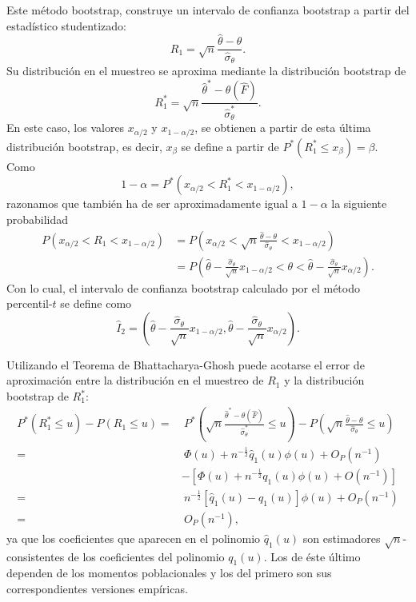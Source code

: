 \documentclass[]{book}
\theoremstyle{break}
\theoremstyle{definition}
\theoremstyle{definition}
\theoremstyle{definition}
\theoremstyle{remark}
\begin{document}
Este método bootstrap, construye un intervalo de confianza bootstrap a
partir del estadístico studentizado:
\[R_1=\sqrt{n}\frac{\hat{\theta}-\theta }{\hat{\sigma}_{\theta }}.\] Su
distribución en el muestreo se aproxima mediante la distribución
bootstrap de
\[R_1^{\ast}=\sqrt{n}\frac{\hat{\theta}^{\ast}-\theta \left( \hat{F}
 \right)}{\hat{\sigma}_{\theta }^{\ast}}.\] En este caso, los valores
\(x_{\alpha /2}\) y \(x_{1-\alpha /2}\), se obtienen a partir de esta
última distribución bootstrap, es decir, \(x_{\beta }\) se define a
partir de \(P^{\ast}\left( R_1^{\ast}\leq x_{\beta } \right) =\beta\).
Como
\[1-\alpha =P^{\ast}\left( x_{\alpha /2}<R_1^{\ast}<x_{1-\alpha /2} \right),\]
razonamos que también ha de ser aproximadamente igual a \(1-\alpha\) la
siguiente probabilidad \[\begin{aligned}
P\left( x_{\alpha /2}<R_1<x_{1-\alpha /2} \right) &= P\left( x_{\alpha /2}<
\sqrt{n}\frac{\hat{\theta}-\theta }{\hat{\sigma}_{\theta }}<x_{1-\alpha
/2} \right) \\
&= P\left( \hat{\theta}-\frac{\hat{\sigma}_{\theta }}{\sqrt{n}}x_{1-\alpha
/2}<\theta <\hat{\theta}-\frac{\hat{\sigma}_{\theta }}{\sqrt{n}}x_{\alpha
/2} \right).
\end{aligned}\] Con lo cual, el intervalo de confianza bootstrap
calculado por el método percentil-\(t\) se define como
\[\hat{I}_2=\left( \hat{\theta}-\frac{\hat{\sigma}_{\theta }}{\sqrt{n}}
x_{1-\alpha /2},\hat{\theta}-\frac{\hat{\sigma}_{\theta }}{\sqrt{n}}
x_{\alpha /2} \right).\]

Utilizando el Teorema de Bhattacharya-Ghosh puede acotarse el error de
aproximación entre la distribución en el muestreo de \(R_1\) y la
distribución bootstrap de \(R_1^{\ast}\): \[\begin{aligned}
P^{\ast}\left( R_1^{\ast}\leq u \right) -P\left( R_1\leq u \right)
=&\ P^{\ast}\left( \sqrt{n}\frac{\hat{\theta}^{\ast}-\theta \left( \hat{F}
 \right)}{\hat{\sigma}_{\theta }^{\ast}}\leq u \right)-P\left( \sqrt{n}
\frac{\hat{\theta}-\theta }{\hat{\sigma}_{\theta }}\leq u \right)  \\
=&\  \Phi \left( u \right) +n^{-\frac{1}{2}}\hat{q}_1\left( u \right) \phi
\left( u \right) +O_{P}\left( n^{-1} \right) \\
&-\left[ \Phi \left( u \right) +n^{-\frac{1}{2}}q_1\left( u \right) \phi
\left( u \right) +O\left( n^{-1} \right) \right] \\
=&\  n^{-\frac{1}{2}}\left[ \hat{q}_1\left( u \right) -q_1\left( u \right) 
\right] \phi \left( u \right) +O_{P}\left( n^{-1} \right) \\
=&\ O_{P}\left( n^{-1} \right),
\end{aligned}\] ya que los coeficientes que aparecen en el polinomio
\(\hat{q}_1\left( u \right)\) son estimadores \(\sqrt{n}\)-consistentes
de los coeficientes del polinomio \(q_1\left( u \right)\). Los de éste
último dependen de los momentos poblacionales y los del primero son sus
correspondientes versiones empíricas.
\end{document}
